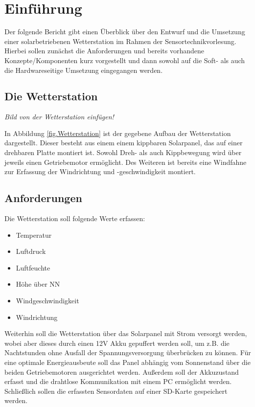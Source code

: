 \section{Einführung}\label{sec:einfuehrung}
Der folgende Bericht gibt einen Überblick über den Entwurf und die Umsetzung einer solarbetriebenen Wetterstation im Rahmen der Sensortechnikvorlesung. Hierbei sollen zunächst die Anforderungen und bereits vorhandene Konzepte/Komponenten kurz vorgestellt und dann sowohl auf die Soft- als auch die Hardwareseitige Umsetzung eingegangen werden.

\subsection{Die Wetterstation}\label{subsec:Wetterstation}
\textit{Bild von der Wetterstation einfügen!}

In Abbildung \ref{fig.Wetterstation} ist der gegebene Aufbau der Wetterstation dargestellt. Dieser besteht aus einem einem kippbaren Solarpanel, das auf einer drehbaren Platte montiert ist. Sowohl Dreh- als auch Kippbewegung wird über jeweils einen Getriebemotor ermöglicht. Des Weiteren ist bereits eine Windfahne zur Erfassung der Windrichtung und -geschwindigkeit montiert.

\subsection{Anforderungen}\label{subsec:Anforderungen}
Die Wetterstation soll folgende Werte erfassen:

\begin{itemize}
\item Temperatur
\item Luftdruck
\item Luftfeuchte
\item Höhe über NN
\item Windgeschwindigkeit
\item Windrichtung
\end{itemize}

Weiterhin soll die Wetterstation über das Solarpanel mit Strom versorgt werden, wobei aber dieses durch einen 12V Akku gepuffert werden soll, um z.B. die Nachtstunden ohne Ausfall der Spannungsversorgung überbrücken zu können. Für eine optimale Energieausbeute soll das Panel abhängig vom Sonnenstand über die beiden Getriebemotoren ausgerichtet werden. Außerdem soll der Akkuzustand erfasst und die drahtlose Kommunikation mit einem PC ermöglicht werden. Schließlich sollen die erfassten Sensordaten auf einer SD-Karte gespeichert werden.


